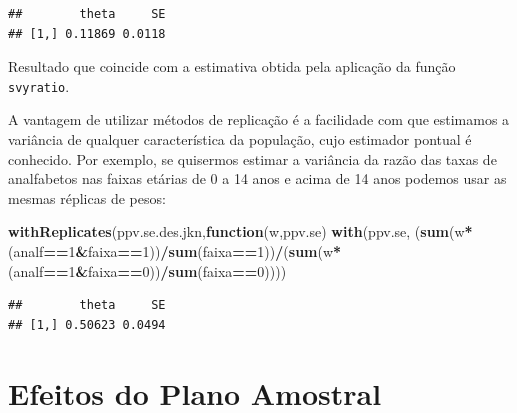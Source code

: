 \documentclass[]{book}
\newenvironment{Shaded}{\begin{snugshade}}{\end{snugshade}}
\newcommand{\KeywordTok}[1]{\textcolor[rgb]{0.13,0.29,0.53}{\textbf{#1}}}
\newcommand{\DecValTok}[1]{\textcolor[rgb]{0.00,0.00,0.81}{#1}}
\newcommand{\ControlFlowTok}[1]{\textcolor[rgb]{0.13,0.29,0.53}{\textbf{#1}}}
\newcommand{\OperatorTok}[1]{\textcolor[rgb]{0.81,0.36,0.00}{\textbf{#1}}}
\newcommand{\NormalTok}[1]{#1}
\theoremstyle{definition}
\theoremstyle{definition}
\theoremstyle{definition}
\theoremstyle{remark}
\begin{document}
\begin{Shaded}
\end{Shaded}

\begin{verbatim}
##        theta     SE
## [1,] 0.11869 0.0118
\end{verbatim}

Resultado que coincide com a estimativa obtida pela aplicação da função
\texttt{svyratio}.

A vantagem de utilizar métodos de replicação é a facilidade com que
estimamos a variância de qualquer característica da população, cujo
estimador pontual é conhecido. Por exemplo, se quisermos estimar a
variância da razão das taxas de analfabetos nas faixas etárias de 0 a 14
anos e acima de 14 anos podemos usar as mesmas réplicas de pesos:

\begin{Shaded}
\begin{Highlighting}[]
\KeywordTok{withReplicates}\NormalTok{(ppv.se.des.jkn,}\ControlFlowTok{function}\NormalTok{(w,ppv.se) }\KeywordTok{with}\NormalTok{(ppv.se,}
\NormalTok{(}\KeywordTok{sum}\NormalTok{(w}\OperatorTok{*}\NormalTok{(analf}\OperatorTok{==}\DecValTok{1}\OperatorTok{&}\NormalTok{faixa}\OperatorTok{==}\DecValTok{1}\NormalTok{))}\OperatorTok{/}\KeywordTok{sum}\NormalTok{(faixa}\OperatorTok{==}\DecValTok{1}\NormalTok{))}\OperatorTok{/}\NormalTok{(}\KeywordTok{sum}\NormalTok{(w}\OperatorTok{*}\NormalTok{(analf}\OperatorTok{==}\DecValTok{1}\OperatorTok{&}\NormalTok{faixa}\OperatorTok{==}\DecValTok{0}\NormalTok{))}\OperatorTok{/}\KeywordTok{sum}\NormalTok{(faixa}\OperatorTok{==}\DecValTok{0}\NormalTok{))))}
\end{Highlighting}
\end{Shaded}

\begin{verbatim}
##        theta     SE
## [1,] 0.50623 0.0494
\end{verbatim}

\chapter{Efeitos do Plano Amostral}\label{epa}
\end{document}
